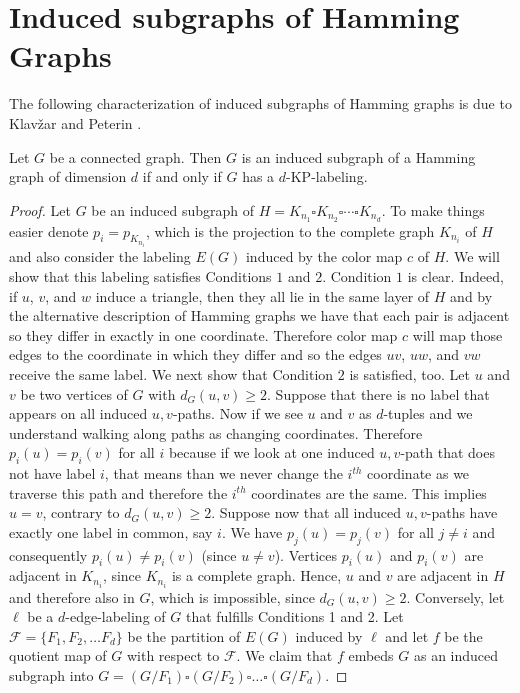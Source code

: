 \documentclass[12pt,a4paper,titlepage,openany]{report}
\begin{document}
\section{Induced subgraphs of Hamming Graphs}
The following characterization of induced subgraphs of Hamming graphs is due to Klav\v zar and Peterin \cite{Iztok}.
\begin{theorem}\label{thm:mainkp}
Let $G$ be a connected graph. Then $G$ is an induced subgraph of a Hamming graph of dimension $d$ if and only if $G$ has a $d$-KP-labeling.
\end{theorem}
\begin{proof}
Let $G$ be an induced subgraph of $H=K_{n_1}\square K_{n_2}\square\cdots\square K_{n_d}$. To make things easier denote $p_i=p_{K_{n_i}}$, which is the projection to the complete graph $K_{n_i}$ of $H$ and also consider the labeling $E(G)$ induced by the color map $c$ of $H$. We will show that this labeling satisfies Conditions $1$ and $2$.\newline
Condition $1$ is clear. Indeed, if $u$, $v$, and $w$ induce a triangle, then they all lie in
the same layer of $H$ and by the alternative description of Hamming graphs we have that each pair is adjacent so they differ in exactly in one coordinate. Therefore color map $c$ will map those edges to the coordinate in which they differ and so the edges $uv$, $uw$, and $vw$ receive the same label.\newline
We next show that Condition $2$ is satisfied, too. Let $u$ and $v$ be two vertices of $G$ with $d_G(u,v)\geq 2$.
Suppose that there is no label that appears on all induced $u, v$-paths. Now if we see $u$ and $v$ as $d$-tuples and we understand walking along paths as changing coordinates. Therefore $p_i(u)=p_i(v)$ for all $i$ because if we look at one induced $u,v$-path that does not have label $i$, that means than we never change the $i^{th}$ coordinate as we traverse this path and therefore the $i^{th}$ coordinates are the same. This implies $u=v$, contrary to $d_G(u,v)\geq 2$. Suppose now that all induced $u, v$-paths have exactly one label in common, say $i$. We have $p_j(u)=p_j(v)$ for all $j\neq i$ and consequently $p_i(u)\neq p_i(v)$ (since $u\neq v$). Vertices $p_i(u)$ and $p_i(v)$ are adjacent in $K_{n_i}$, since $K_{n_i}$ is a complete graph. Hence, $u$ and $v$ are adjacent in $H$ and therefore also in $G$, which is impossible, since $d_G(u,v)\geq 2$.\medskip \newline 
Conversely, let $\ell$ be a $d$-edge-labeling of $G$ that fulfills Conditions 1 and 2. Let $\mathcal{F}=\{F_1,F_2,\ldots F_d\}$ be the partition of $E(G)$ induced by $\ell$ and let $f$ be the quotient map of $G$ with respect to $\mathcal{F}$. We claim that $f$ embeds $G$ as an induced subgraph into $G=(G/ F_1)\square (G/ F_2)\square \ldots \square (G/ F_d)$.\newline

\end{proof}
\end{document}
